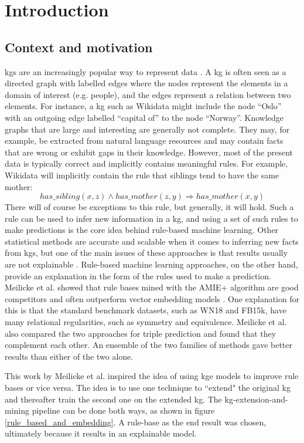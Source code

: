 \chapter{Introduction}
\section{Context and motivation}
\Glspl{kg} are an increasingly popular way to represent data \cite{hogan2020knowledge}.
A \gls{kg} is often seen as a directed graph with labelled edges where the nodes represent the elements in a domain of interest (e.g. people), and the edges represent a relation between two elements. For instance, a \gls{kg} such as Wikidata might include the node ``Oslo'' with an outgoing edge labelled ``capital of'' to the node ``Norway''. Knowledge graphs that are large and interesting are generally not complete. They may, for example, be extracted from natural language resources and may contain facts that are wrong or exhibit gaps in their knowledge. However, most of the present data is typically correct and implicitly contains meaningful rules. For example, Wikidata will implicitly contain the rule that siblings tend to have the same mother:
\[has\_sibling(x, z) \wedge has\_mother(z, y) \Rightarrow has\_mother(x, y)\]
There will of course be exceptions to this rule, but generally, it will hold. Such a rule can be used to infer new information in a \gls{kg}, and using a set of such rules to make predictions is the core idea behind rule-based machine learning. Other statistical methods are accurate and scalable when it comes to inferring new facts from \glspl{kg}, but one of the main issues of these approaches is that results usually are not explainable \cite{bonatti2019knowledge}. Rule-based machine learning approaches, on the other hand, provide an explanation in the form of the rules used to make a prediction. Meilicke et al. showed that rule bases mined with the AMIE+ algorithm are good competitors and often outperform vector embedding models \cite{ensemble}. One explanation for this is that the standard benchmark datasets, such as WN18 and FB15k,  have many relational regularities, such as symmetry and equivalence. Meilicke et al. also compared the two approaches for triple prediction and found that they complement each other. An ensemble of the two families of methods gave better results than either of the two alone.

This work by Meilicke et al. inspired the idea of using \gls{kge} models to improve rule bases or vice versa. The idea is to use one technique to ``extend" the original \gls{kg} and thereafter train the second one on the extended \gls{kg}. The \gls{kg}-extension-and-mining pipeline can be done both ways, as shown in figure \ref{rule_based_and_embedding}. A rule-base as the end result was chosen, ultimately because it results in an explainable model.

